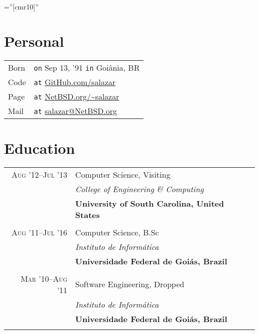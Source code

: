 \documentclass[a4paper,10pt]{article}
\begin{document}
\font\fb=''[cmr10]''

\par{\bigskip\par\vspace{8ex}}

\section{Personal}
\begin{tabular}{l@{\hskip 0.2cm}l}
  Born & \texttt{on} Sep 13, '91 \texttt{in} Goiânia, BR \\
  Code & \texttt{at} \href{https://www.github.com/salazar/}
                          {GitHub.com/salazar} \\
  Page & \texttt{at} \href{https://www.netbsd.org/~salazar}
                          {NetBSD.org/\textasciitilde salazar} \\
  Mail & \texttt{at} \href{mailto:salazar@NetBSD.org}
                          {salazar@NetBSD.org} 
\end{tabular}

\section{Education}
\begin{tabular}{r|p{11cm}}

  \textsc{Aug '12--Jul '13} & Computer Science, Visiting\\ &
  \emph{College of Engineering \& Computing}\\ &
  \textbf{University of South Carolina, United States}
  \\\multicolumn{2}{c}{} \\

  \textsc{Aug '11--Jul '16} & Computer Science, B.Sc\\ &
  \emph{Instituto de Informática}\\ &
  \textbf{Universidade Federal de Goiás, Brazil}
  \\\multicolumn{2}{c}{} \\

  \textsc{Mar '10--Aug '11} & Software Engineering, Dropped \\ &
  \emph{Instituto de Informática}\\ &
  \textbf{Universidade Federal de Goiás, Brazil}
  \\\multicolumn{2}{c}{}

\end{tabular}
\end{document}
